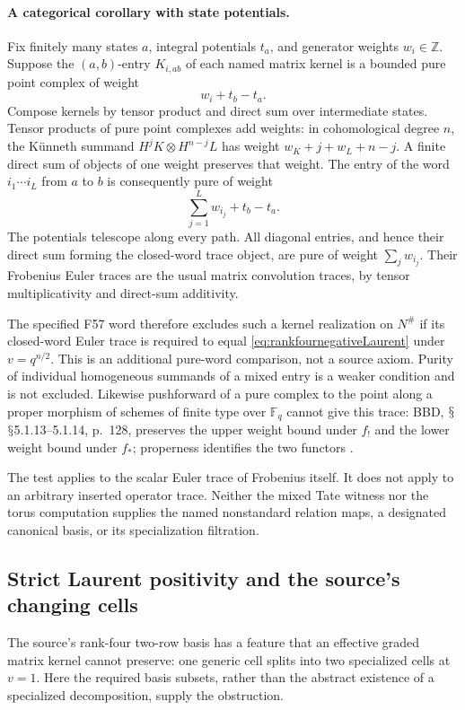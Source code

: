\documentclass[11pt,a4paper]{article}
\renewcommand{\S}{\ensuremath{\mathsection}}
\newcommand{\fid}[1]{\textsf{#1}}\newcommand{\gate}[1]{\textsf{#1}}
\theoremstyle{named}\newtheorem{finding}{Finding}[section]
\theoremstyle{definition}\newtheorem{definition}[finding]{Definition}
\theoremstyle{remark}\newtheorem{remark}[finding]{Remark}
\begin{document}
\paragraph{A categorical corollary with state potentials.}
Fix finitely many states \(a\), integral potentials \(t_a\),
and generator weights \(w_i\in\mathbb Z\).
Suppose the \((a,b)\)-entry \(K_{i,ab}\) of each named
matrix kernel is a bounded pure point complex of weight
\begin{equation}\label{eq:purekernelstatepotential}
                            w_i+t_b-t_a.
\end{equation}
Compose kernels by tensor product and direct sum over
intermediate states. Tensor products of pure point
complexes add weights: in cohomological degree \(n\),
the K\"unneth summand \(H^jK\otimes H^{n-j}L\)
has weight \(w_K+j+w_L+n-j\).
A finite direct sum of objects of one weight preserves
that weight.
The entry of the word \(i_1\cdots i_L\) from \(a\) to
\(b\) is consequently pure of weight
\[
                        \sum_{j=1}^Lw_{i_j}+t_b-t_a.
\]
The potentials telescope along every path. All diagonal
entries, and hence their direct sum forming the closed-word
trace object, are pure of weight \(\sum_jw_{i_j}\).
Their Frobenius Euler traces are the usual matrix
convolution traces, by tensor multiplicativity and
direct-sum additivity.

The specified \fid{F57} word therefore excludes such a
kernel realization on \(N^\#\) if its closed-word Euler
trace is required to equal
\eqref{eq:rankfournegativeLaurent} under
\(v=q^{n/2}\).
This is an additional pure-word comparison, not a source
axiom. Purity of individual homogeneous summands of a
mixed entry is a weaker condition and is not excluded.
Likewise pushforward of a pure complex to the point along
a proper morphism of schemes of finite type over
\(\mathbb F_q\) cannot give this trace: BBD,
\S\S5.1.13--5.1.14, p.~128, preserves the upper weight
bound under \(f_!\) and the lower weight bound under
\(f_*\); properness identifies the two functors
\cite{BBD}.

The test applies to the scalar Euler trace of Frobenius
itself. It does not apply to an arbitrary inserted
operator trace. Neither the mixed Tate witness nor the
torus computation supplies the named nonstandard relation
maps, a designated canonical basis, or its specialization
filtration.

\subsection{Strict Laurent positivity and the source's changing cells}
The source's rank-four two-row basis has a feature that an
effective graded matrix kernel cannot preserve: one generic cell
splits into two specialized cells at \(v=1\).
Here the required basis subsets, rather than the abstract
existence of a specialized decomposition, supply the obstruction.
\end{document}

